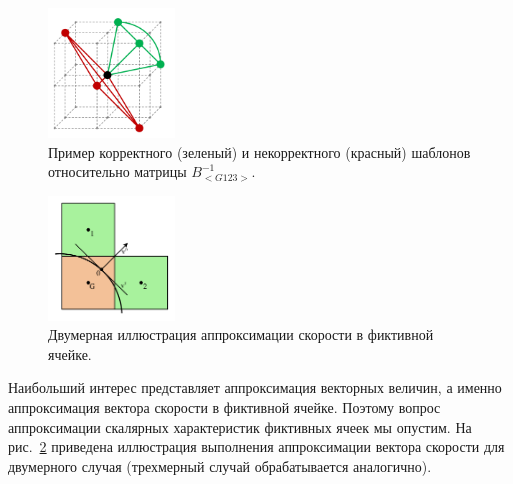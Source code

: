\begin{figure}[ht]
\centering
\includegraphics[width=0.3\textwidth]{fig/int_template.pdf}
\singlespacing
{}\caption{Пример корректного (зеленый) и некорректного (красный) шаблонов относительно матрицы $B_{<G123>}^{-1}$.}
\label{fig:text_1_immersed_boundary_method_template}
\end{figure}

\begin{figure}[ht]
\centering
\includegraphics[width=0.3\textwidth]{fig/int_3_points_lin_appr_velocity_2d.pdf}
\singlespacing
{}\caption{Двумерная иллюстрация аппроксимации скорости в фиктивной ячейке.}
\label{fig:text_1_immersed_boundary_method_2}
\end{figure}

Наибольший интерес представляет аппроксимация векторных величин, а именно аппроксимация вектора скорости в фиктивной ячейке.
Поэтому вопрос аппроксимации скалярных характеристик фиктивных ячеек мы опустим.
На рис.~\ref{fig:text_1_immersed_boundary_method_2} приведена иллюстрация выполнения аппроксимации вектора скорости для двумерного случая (трехмерный случай обрабатывается аналогично).



